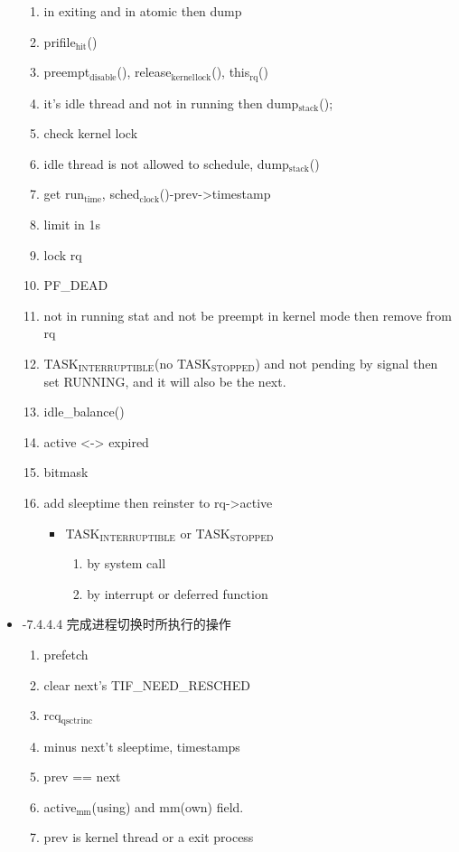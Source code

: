 \documentclass[11pt]{article}
\begin{document}
\begin{itemize}
\begin{enumerate}
\item in exiting and in atomic then dump
\item prifile$_{\mathrm{hit}}$()
\item preempt$_{\mathrm{disable}}$(), release$_{\mathrm{kernel}}$$_{\mathrm{lock}}$(), this$_{\mathrm{rq}}$()
\item it's idle thread and not in running then dump$_{\mathrm{stack}}$();
\item check kernel lock
\item idle thread is not allowed to schedule, dump$_{\mathrm{stack}}$()
\item get run$_{\mathrm{time}}$, sched$_{\mathrm{clock}}$()-prev->timestamp
\item limit in 1s
\item lock rq
\item PF\_DEAD
\item not in running stat and not be preempt in kernel mode then remove from rq
\item TASK$_{\mathrm{INTERRUPTIBLE}}$(no TASK$_{\mathrm{STOPPED}}$) and not pending by signal then
    set RUNNING, and it will also be the next.
\item idle\_balance()
\item active <-> expired
\item bitmask
\item add sleeptime then reinster to rq->active

\begin{itemize}
\item TASK$_{\mathrm{INTERRUPTIBLE}}$ or TASK$_{\mathrm{STOPPED}}$

\begin{enumerate}
\item by system call
\item by interrupt or deferred function
\end{enumerate}

\end{itemize}

\end{enumerate}

\item -7.4.4.4 完成进程切换时所执行的操作\\
\label{sec-2.4.4.4}

\begin{enumerate}
\item prefetch
\item clear next's  TIF\_NEED\_RESCHED
\item rcq$_{\mathrm{qsctr}}$$_{\mathrm{inc}}$
\item minus next't sleeptime, timestamps
\item prev == next
\item active$_{\mathrm{mm}}$(using) and mm(own) field.
\item prev is kernel thread or a exit process


\end{enumerate}
\end{itemize}
\end{document}
